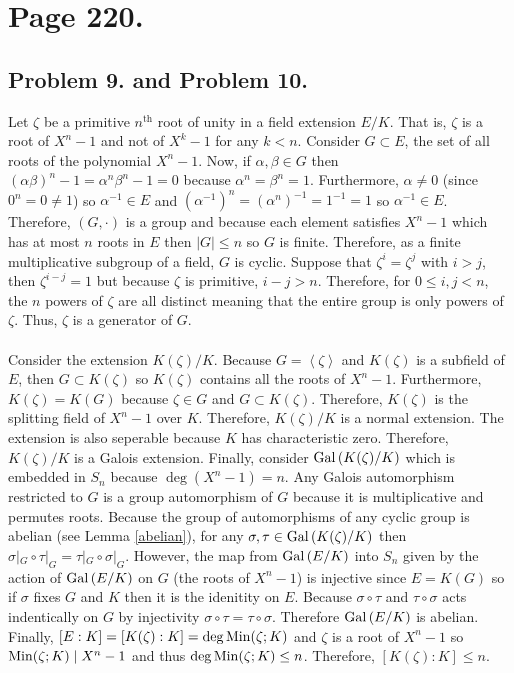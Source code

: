 \documentclass[12pt]{extarticle}
\begin{document}
\section*{Page 220.}
\subsection*{Problem 9. and Problem 10.}

Let $\zeta$ be a primitive $n^{\mathrm{th}}$ root of unity in a field extension $E/K$. That is, $\zeta$ is a root of $X^n - 1$ and not of $X^k - 1$ for any $k < n$. Consider $G\subset E$, the set of all roots of the polynomial $X^n - 1$. Now, if $\alpha, \beta \in G$ then $(\alpha \beta)^n - 1 = \alpha^n \beta^n - 1 = 0$ because $\alpha^n = \beta^n = 1$. Furthermore, $\alpha \neq 0$ (since $0^n = 0 \neq 1$) so $\alpha^{-1} \in E$ and $(\alpha^{-1})^n = (\alpha^n)^{-1} = 1^{-1} = 1$ so $\alpha^{-1} \in E$. Therefore, $(G, \cdot)$ is a group and because each element satisfies $X^n - 1$ which has at most $n$ roots in $E$ then $|G| \le n$ so $G$ is finite. Therefore, as a finite multiplicative subgroup of a field, $G$ is cyclic. Suppose that $\zeta^i = \zeta^j$ with $i > j$, then $\zeta^{i - j} = 1$ but because $\zeta$ is primitive, $i - j > n$. Therefore, for $0 \le i, j < n$, the $n$ powers of $\zeta$ are all distinct meaning that the entire group is only powers of $\zeta$. Thus, $\zeta$ is a generator of $G$. \\\\
Consider the extension $K(\zeta)/K$. Because $G = \left< \zeta \right>$ and $K(\zeta)$ is a subfield of $E$, then $G \subset K(\zeta)$ so $K(\zeta)$ contains all the roots of $X^n - 1$. Furthermore, $K(\zeta) = K(G)$ because $\zeta \in G$ and $G \subset K(\zeta)$. Therefore, $K(\zeta)$ is the splitting field of $X^n - 1$ over $K$. Therefore, $K(\zeta)/K$ is a normal extension. The extension is also seperable because $K$ has characteristic zero. Therefore, $K(\zeta)/K$ is a Galois extension. Finally, consider $\mathrm{Gal}\left( K(\zeta)/K \right)$ which is embedded in $S_n$ because $\deg{(X^n - 1)} = n$. Any Galois automorphism restricted to $G$ is a group automorphism of $G$ because it is multiplicative and permutes roots. Because the group of automorphisms of any cyclic group is abelian (see Lemma \ref{abelian}), for any $\sigma, \tau \in \mathrm{Gal}\left( K(\zeta)/K \right)$ then $\sigma|_G \circ \tau|_G = \tau|_G \circ \sigma|_G$. However, the map from $\mathrm{Gal}\left( E/K \right)$ into $S_n$ given by the action of $\mathrm{Gal}\left( E/K \right)$ on $G$ (the roots of $X^n - 1$) is injective since $E = K(G)$ so if $\sigma$ fixes $G$ and $K$ then it is the idenitity on $E$. Because $\sigma \circ \tau$ and $\tau \circ \sigma$ acts indentically on $G$ by injectivity $\sigma \circ \tau = \tau \circ \sigma$. Therefore $\mathrm{Gal}\left( E/K \right)$ is abelian. \bigskip \\
Finally, $[E : K] = [K(\zeta) : K] = \deg{\mathrm{Min}(\zeta;K)}$ and $\zeta$ is a root of $X^n - 1$ so $\mathrm{Min}(\zeta;K) \mid X^n - 1$ and thus $\deg{\mathrm{Min}(\zeta;K)} \le n$. Therefore, $[K(\zeta) : K] \le n$. 
\end{document}
